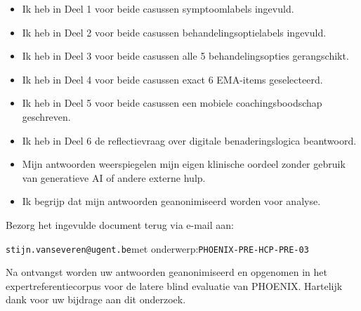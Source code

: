 \documentclass[11pt,a4paper]{article}
\begin{document}
\begin{instrbox}[title=Checklist voor terugbezorging]
\begin{itemize}
\item[$\square$] Ik heb in Deel 1 voor beide casussen symptoomlabels ingevuld.
\item[$\square$] Ik heb in Deel 2 voor beide casussen behandelingsoptielabels ingevuld.
\item[$\square$] Ik heb in Deel 3 voor beide casussen alle 5 behandelingsopties gerangschikt.
\item[$\square$] Ik heb in Deel 4 voor beide casussen exact 6 EMA-items geselecteerd.
\item[$\square$] Ik heb in Deel 5 voor beide casussen een mobiele coachingsboodschap geschreven.
\item[$\square$] Ik heb in Deel 6 de reflectievraag over digitale benaderingslogica beantwoord.
\item[$\square$] Mijn antwoorden weerspiegelen mijn eigen klinische oordeel zonder gebruik van generatieve AI of andere externe hulp.
\item[$\square$] Ik begrijp dat mijn antwoorden geanonimiseerd worden voor analyse.
\end{itemize}
\end{instrbox}

\medskip
Bezorg het ingevulde document terug via e-mail aan:
\begin{center}
\texttt{stijn.vanseveren@ugent.be}\quad met onderwerp:\quad \texttt{PHOENIX-PRE-HCP-PRE-03}
\end{center}

\vspace{0.5em}
\begin{tcolorbox}[colback=AccentBlue,colframe=PrimaryBlue,arc=2mm,boxrule=0.6pt,left=8pt,right=8pt,top=7pt,bottom=7pt]
\small\centering
Na ontvangst worden uw antwoorden geanonimiseerd en opgenomen in het expertreferentiecorpus
voor de latere blind evaluatie van PHOENIX. Hartelijk dank voor uw bijdrage aan dit onderzoek.
\end{tcolorbox}
\end{document}
